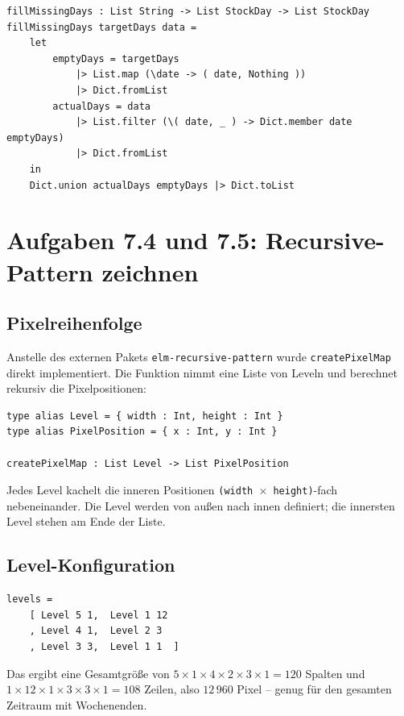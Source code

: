 \documentclass[11pt,a4paper]{article}
\begin{document}
\begin{verbatim}
fillMissingDays : List String -> List StockDay -> List StockDay
fillMissingDays targetDays data =
    let
        emptyDays = targetDays
            |> List.map (\date -> ( date, Nothing ))
            |> Dict.fromList
        actualDays = data
            |> List.filter (\( date, _ ) -> Dict.member date emptyDays)
            |> Dict.fromList
    in
    Dict.union actualDays emptyDays |> Dict.toList
\end{verbatim}

\section*{Aufgaben 7.4 und 7.5: Recursive-Pattern zeichnen}

\subsection*{Pixelreihenfolge}

Anstelle des externen Pakets \texttt{elm-recursive-pattern} wurde
\texttt{createPixelMap} direkt implementiert. Die Funktion nimmt eine Liste
von Leveln und berechnet rekursiv die Pixel\-positionen:

\begin{verbatim}
type alias Level = { width : Int, height : Int }
type alias PixelPosition = { x : Int, y : Int }

createPixelMap : List Level -> List PixelPosition
\end{verbatim}

Jedes Level kachelt die inneren Positionen \texttt{(width $\times$ height)}-fach
nebeneinander. Die Level werden von außen nach innen definiert; die innersten
Level stehen am Ende der Liste.

\subsection*{Level-Konfiguration}

\begin{verbatim}
levels =
    [ Level 5 1,  Level 1 12
    , Level 4 1,  Level 2 3
    , Level 3 3,  Level 1 1  ]
\end{verbatim}

Das ergibt eine Gesamtgröße von
$5 \times 1 \times 4 \times 2 \times 3 \times 1 = 120$ Spalten und
$1 \times 12 \times 1 \times 3 \times 3 \times 1 = 108$ Zeilen,
also $12\,960$ Pixel -- genug für den gesamten Zeitraum mit Wochenenden.
\end{document}
